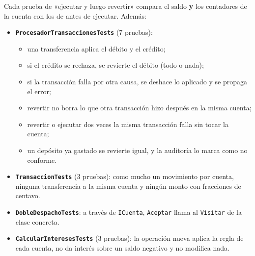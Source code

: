 Cada prueba de «ejecutar y luego revertir» compara el saldo \textbf{y} los contadores de la
cuenta con los de antes de ejecutar. Además:
\begin{itemize}
  \item \textbf{\texttt{ProcesadorTransaccionesTests}} (7 pruebas):
        \begin{itemize}
          \item una transferencia aplica el débito y el crédito;
          \item si el crédito se rechaza, se revierte el débito (todo o nada);
          \item si la transacción falla por otra causa, se deshace lo aplicado y se propaga
                el error;
          \item revertir no borra lo que otra transacción hizo después en la misma cuenta;
          \item revertir o ejecutar dos veces la misma transacción falla sin tocar la cuenta;
          \item un depósito ya gastado se revierte igual, y la auditoría lo marca como no
                conforme.
        \end{itemize}
  \item \textbf{\texttt{TransaccionTests}} (3 pruebas): como mucho un movimiento por cuenta,
        ninguna transferencia a la misma cuenta y ningún monto con fracciones de centavo.
  \item \textbf{\texttt{DobleDespachoTests}}: a través de \texttt{ICuenta}, \texttt{Aceptar}
        llama al \texttt{Visitar} de la clase concreta.
  \item \textbf{\texttt{CalcularInteresesTests}} (3 pruebas): la operación nueva aplica la
        regla de cada cuenta, no da interés sobre un saldo negativo y no modifica nada.
\end{itemize}
